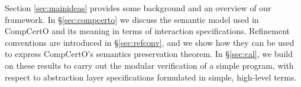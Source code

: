 \documentclass[sigplan,10pt,review,anonymous]{acmart}
\begin{document}
Section \ref{sec:mainideas}
provides some background and
an overview of our framework.
In \S\ref{sec:compcerto}
we discuss the semantic model used in CompCertO
and its meaning in terms of interaction specifications.
Refinement conventions are introduced in \S\ref{sec:refconv},
and we show how they can be used to express
CompCertO's semantics preservation theorem.
In \S\ref{sec:cal},
we build on these results
to carry out the modular verification of
a simple program,
with respect to abstraction layer specifications
formulated in simple, high-level terms.

%
%
%
%
%
%
%
%
\end{document}
